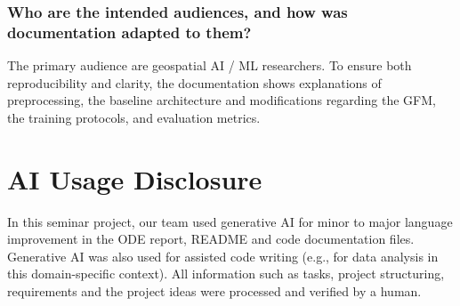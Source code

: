 \documentclass[sigconf]{acmart}
\begin{document}
\subsubsection{Who are the intended audiences, and how was documentation adapted to them?} The primary audience are geospatial AI / ML researchers. To ensure both reproducibility and clarity, the documentation shows explanations of preprocessing, the baseline architecture and modifications regarding the GFM, the training protocols, and evaluation metrics.




\section*{AI Usage Disclosure}
In this seminar project, our team used generative AI for minor to major language improvement in the ODE report, README and code documentation files. Generative AI was also used for assisted code writing (e.g., for data analysis in this domain-specific context). All information such as tasks, project structuring, requirements and the project ideas were processed and verified by a human.
\end{document}
